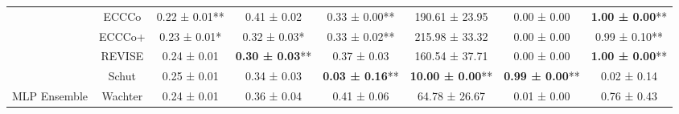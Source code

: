 \begin{table}
{\begin{tabular}[t]{cccccccc}
 & ECCCo & 0.22 ± 0.01** & 0.41 ± 0.02\hphantom{*}\hphantom{*} & 0.33 ± 0.00** & 190.61 ± 23.95\hphantom{*}\hphantom{*} & 0.00 ± 0.00\hphantom{*}\hphantom{*} & \textbf{1.00 ± 0.00}**\\

 & ECCCo+ & 0.23 ± 0.01*\hphantom{*} & 0.32 ± 0.03*\hphantom{*} & 0.33 ± 0.02** & 215.98 ± 33.32\hphantom{*}\hphantom{*} & 0.00 ± 0.00\hphantom{*}\hphantom{*} & 0.99 ± 0.10**\\

 & REVISE & 0.24 ± 0.01\hphantom{*}\hphantom{*} & \textbf{0.30 ± 0.03}** & 0.37 ± 0.03\hphantom{*}\hphantom{*} & 160.54 ± 37.71\hphantom{*}\hphantom{*} & 0.00 ± 0.00\hphantom{*}\hphantom{*} & \textbf{1.00 ± 0.00}**\\

 & Schut & 0.25 ± 0.01\hphantom{*}\hphantom{*} & 0.34 ± 0.03\hphantom{*}\hphantom{*} & \textbf{0.03 ± 0.16}** & \textbf{10.00 ± 0.00}** & \textbf{0.99 ± 0.00}** & 0.02 ± 0.14\hphantom{*}\hphantom{*}\\

\multirow[t]{-6}{*}{\centering\arraybackslash MLP Ensemble} & Wachter & 0.24 ± 0.01\hphantom{*}\hphantom{*} & 0.36 ± 0.04\hphantom{*}\hphantom{*} & 0.41 ± 0.06\hphantom{*}\hphantom{*} & 64.78 ± 26.67\hphantom{*}\hphantom{*} & 0.01 ± 0.00\hphantom{*}\hphantom{*} & 0.76 ± 0.43\hphantom{*}\hphantom{*}\\
\bottomrule
\end{tabular}}
\end{table}
